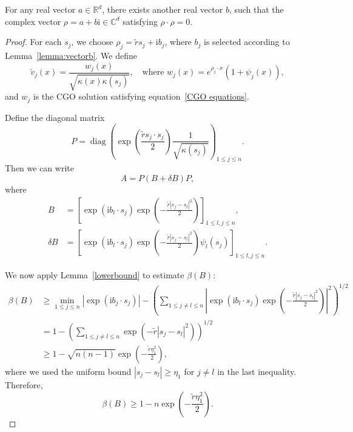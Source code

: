 \documentclass[10pt,a4paper]{amsart}
\begin{document}
\begin{lem}\label{lemma:vectorb}
   For any real vector $a\in \mathbb{R}^d$, there exists another real vector $b$, such that the complex vector $\rho =a+b\mathrm{i} \in \mathbb{C}^d$ satisfying $\rho \cdot \rho=0$.
\end{lem}

\begin{proof}
For each $s_j$, we choose $\rho_j = \tilde{r} s_j + \mathrm{i} b_j$, where $b_j$ is selected according to Lemma~\ref{lemma:vectorb}. We define
\begin{equation*}
    \tilde{v}_j(x) = \frac{w_j(x)}{\sqrt{\kappa(x)\kappa(s_j)}}, \quad \text{where } w_j(x) = e^{\rho_j \cdot x}\left(1 + \psi_j(x)\right),
\end{equation*}
and $w_j$ is the CGO solution satisfying equation~\eqref{CGO equations}.

Define the diagonal matrix
\[
P = \operatorname{diag}\left( \exp\left(\frac{\tilde{r} s_j \cdot s_j}{2} \right) \frac{1}{\sqrt{\kappa(s_j)}} \right)_{1 \leq j \leq n}.
\]
Then we can write
\[
A = P (B + \delta B) P,
\]
where
\begin{align*}
    B &= \left[ \exp(\mathrm{i} b_l \cdot s_j) \exp\left(-\frac{\tilde{r} |s_j - s_l|^2}{2}\right) \right]_{1 \leq l,j \leq n}, \\
    \delta B &= \left[ \exp(\mathrm{i} b_l \cdot s_j) \exp\left(-\frac{\tilde{r} |s_j - s_l|^2}{2}\right) \psi_l(s_j) \right]_{1 \leq l,j \leq n}.
\end{align*}

We now apply Lemma~\ref{lowerbound} to estimate $\beta(B)$:
\begin{align*}
    \beta(B) 
    &\geq \min_{1 \leq j \leq n} |\exp(\mathrm{i} b_j \cdot s_j)| 
        - \left( \sum_{1 \leq j \neq l \leq n} 
        \left| \exp\left(\mathrm{i} b_l \cdot s_j\right) 
        \exp\left(-\frac{\tilde{r} |s_j - s_l|^2}{2} \right) \right|^2 \right)^{1/2} \\
    &= 1 - \left( \sum_{1 \leq j \neq l \leq n} 
        \exp\left(-\tilde{r} |s_j - s_l|^2 \right) \right)^{1/2} \\
    &\geq 1 - \sqrt{n(n-1)} \exp\left(-\frac{\tilde{r} \eta_1^2}{2} \right),
\end{align*}
where we used the uniform bound $|s_j - s_l| \geq \eta_1$ for $j \neq l$ in the last inequality. Therefore,
\begin{equation}\label{eq:betaB}
    \beta(B) \geq 1 - n \exp\left(-\frac{\tilde{r} \eta_1^2}{2} \right).
\end{equation}


\end{proof}
\end{document}
